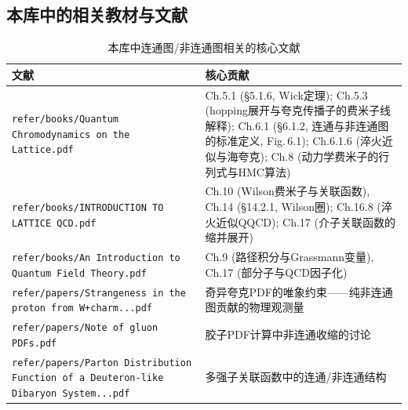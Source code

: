 \documentclass[12pt,a4paper]{ctexart}
\theoremstyle{definition}
\begin{document}
\begin{center}
\end{center}

\subsection{本库中的相关教材与文献}

\begin{table}[H]
\centering
\caption{本库中连通图/非连通图相关的核心文献}
\label{tab:cd_papers}
\small
\begin{tabular}{lp{9cm}}
\toprule
文献 & 核心贡献 \\
\midrule
\texttt{refer/books/Quantum Chromodynamics on the Lattice.pdf} &
Ch.5.1 (\S 5.1.6, Wick定理); Ch.5.3 (hopping展开与夸克传播子的费米子线解释); Ch.6.1 (\S 6.1.2, 连通与非连通图的标准定义, Fig.\,6.1); Ch.6.1.6 (淬火近似与海夸克); Ch.8 (动力学费米子的行列式与HMC算法) \\
\texttt{refer/books/INTRODUCTION TO LATTICE QCD.pdf} &
Ch.10 (Wilson费米子与关联函数), Ch.14 (\S 14.2.1, Wilson圈); Ch.16.8 (淬火近似QQCD); Ch.17 (介子关联函数的缩并展开) \\
\texttt{refer/books/An Introduction to Quantum Field Theory.pdf} &
Ch.9 (路径积分与Grassmann变量), Ch.17 (部分子与QCD因子化) \\
\texttt{refer/papers/Strangeness in the proton from W+charm...pdf} &
奇异夸克PDF的唯象约束——纯非连通图贡献的物理观测量 \\
\texttt{refer/papers/Note of gluon PDFs.pdf} &
胶子PDF计算中非连通收缩的讨论 \\
\texttt{refer/papers/Parton Distribution Function of a Deuteron-like Dibaryon System...pdf} &
多强子关联函数中的连通/非连通结构 \\
\bottomrule
\end{tabular}
\end{table}
\end{document}

